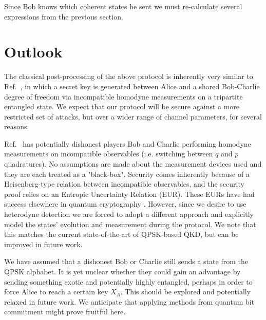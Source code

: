 Since Bob knows which coherent states he sent we must re-calculate several expressions from the previous section. 





























\section{Outlook}
The classical post-processing of the above protocol is inherently very similar to Ref.~\cite{Kogias2017}, in which a secret key is generated between Alice and a shared Bob-Charlie degree of freedom via incompatible homodyne measurements on a tripartite entangled state. We expect that our protocol will be secure against a more restricted set of attacks, but over a wider range of channel parameters, for several reasons. 

Ref.~\cite{Kogias2017} has potentially dishonest players Bob and Charlie performing homodyne measurements on incompatible observables (i.e. switching between $q$ and $p$ quadratures). No assumptions are made about the measurement devices used and they are each treated as a "black-box". Security comes inherently because of a Heisenberg-type relation between incompatible observables, and the security proof relies on an Entropic Uncertainty Relation (EUR). These EURs have had success elsewhere in quantum cryptography . However, since we desire to use heterodyne detection we are forced to adopt a different approach and explicitly model the states' evolution and measurement during the protocol. We note that this matches the current state-of-the-art of QPSK-based QKD, but can be improved in future work.

We have assumed that a dishonest Bob or Charlie still sends a state from the QPSK alphabet. It is yet unclear whether they could gain an advantage by sending something exotic and potentially highly entangled, perhaps in order to force Alice to reach a certain key $X_A$. This should be explored and potentially relaxed in future work. We anticipate that applying methods from quantum bit commitment might prove fruitful here. 

